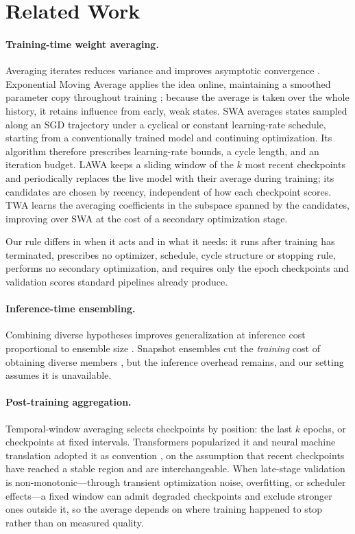 \section{Related Work}
\label{sec:related}

\paragraph{Training-time weight averaging.}
Averaging iterates reduces variance and improves asymptotic convergence
\cite{polyak1992acceleration}. Exponential Moving Average applies the idea
online, maintaining a smoothed parameter copy throughout training
\cite{tarvainen2018meanteachersbetterrole}; because the average is taken over
the whole history, it retains influence from early, weak states. SWA
\cite{izmailov2019averagingweightsleadswider} averages states sampled along an
SGD trajectory under a cyclical or constant learning-rate schedule, starting
from a conventionally trained model and continuing optimization. Its algorithm
therefore prescribes learning-rate bounds, a cycle length, and an iteration
budget. LAWA \cite{kaddour2022stop} keeps a sliding window of the $k$ most recent
checkpoints and periodically replaces the live model with their average during
training; its candidates are chosen by recency, independent of how each
checkpoint scores. TWA \cite{li2022trainable} learns the averaging coefficients
in the subspace spanned by the candidates, improving over SWA at the cost of a
secondary optimization stage.

Our rule differs in when it acts and in what it needs: it runs after training
has terminated, prescribes no optimizer, schedule, cycle structure or stopping
rule, performs no secondary optimization, and requires only the epoch
checkpoints and validation scores standard pipelines already produce.

\paragraph{Inference-time ensembling.}
Combining diverse hypotheses improves generalization at inference cost
proportional to ensemble size \cite{dietterich2000ensemble}. Snapshot ensembles
cut the \emph{training} cost of obtaining diverse members
\cite{huang2017snapshotensemblestrain1}, but the inference overhead remains,
and our setting assumes it is unavailable.

\paragraph{Post-training aggregation.}
Temporal-window averaging selects checkpoints by position: the last $k$ epochs,
or checkpoints at fixed intervals. Transformers popularized it
\cite{vaswani2017attention} and neural machine translation adopted it as
convention \cite{junczys2016neural}, on the assumption that recent checkpoints
have reached a stable region and are interchangeable. When late-stage
validation is non-monotonic---through transient optimization noise,
overfitting, or scheduler effects---a fixed window can admit degraded
checkpoints and exclude stronger ones outside it, so the average depends on
where training happened to stop rather than on measured quality.

